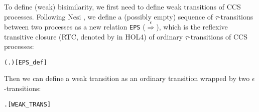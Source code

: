 To define (weak) bisimilarity, we first need to define weak
transitions of CCS processes. 
Following  Nesi \cite{Nesi:1992ve},
we define a (possibly empty) sequence of $\tau$-transitions between
two processes as
a new relation  \texttt{EPS}
($\overset{\epsilon}{\Rightarrow}$), which is the
reflexive transitive closure (RTC, denoted by \mbox{\color{blue}{$^*$}} in
HOL4) of ordinary $\tau$-transitions of CCS processes:
\begin{alltt}
 \HOLSymConst{\HOLTokenDefEquality{}} (\HOLTokenLambda{} .  \HOLTokenTransBegin\HOLSymConst{\ensuremath{\tau}}\HOLTokenTransEnd {})\HOLSymConst{\HOLTokenSupStar{}}\hfill{[EPS_def]}
\end{alltt}
Then we can define a weak transition as an ordinary transition wrapped by
two $\epsilon$-transitions:
\begin{alltt}
 \HOLTokenWeakTransBegin{}\HOLTokenImp{}  \HOLSymConst{\HOLTokenDefEquality{}} \HOLSymConst{\HOLTokenExists{}} .  \HOLSymConst{\HOLTokenEPS}  \HOLSymConst{\HOLTokenConj{}}  \HOLTokenTransBegin{}\HOLTokenTransEnd {} \HOLSymConst{\HOLTokenConj{}}  \HOLSymConst{\HOLTokenEPS} \hfill{[WEAK_TRANS]}
\end{alltt}

